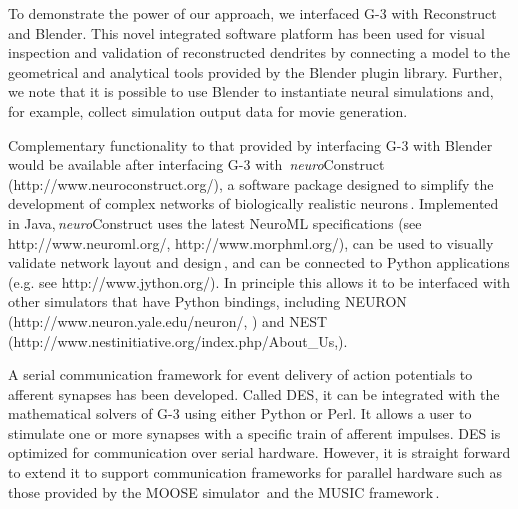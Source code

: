 \documentclass[10pt]{article}
\begin{document}
To demonstrate the power of our approach, we
interfaced G-3 with Reconstruct and Blender. This novel integrated software
platform has been used for visual inspection and validation of
reconstructed dendrites by connecting a model to the geometrical and
analytical tools provided by the Blender plugin library.  Further, we
note that it is possible to use Blender to instantiate neural
simulations and, for example, collect simulation output data for
movie generation.  

Complementary functionality to that provided by interfacing G-3 with
Blender would be available after interfacing G-3 with\,{\it
  neuro}Construct (http://www.neuroconstruct.org/), a software package
designed to simplify the development of complex networks of
biologically realistic neurons\,\cite{gleeson10:neuroml,
  gleeson07}.  Implemented in Java,\,{\it neuro}Construct uses the
latest NeuroML specifications (see http://www.neuroml.org/,
http://www.morphml.org/), can be used to visually validate network
layout and design\,\cite{crook07:_morph}, and can be connected to
Python applications (e.g.  see http://www.jython.org/).  In principle
this allows it to be interfaced with other simulators that have Python
bindings, including NEURON  (http://www.neuron.yale.edu/neuron/, \cite{m93:_neural_system}) and NEST (http://www.nest\-initiative.org/index.php/About\_Us,\cite{diesmann01}).

A serial communication framework for event delivery of action
potentials to afferent synapses has been developed.  Called
DES, it can be integrated
with the mathematical solvers of G-3 using either Python or Perl. It allows a user to stimulate one or more synapses with a specific train of afferent impulses.
DES is optimized for communication over serial hardware. However, it is straight forward
to extend it to support communication frameworks for parallel
hardware such as those provided by the MOOSE
simulator\,\cite{ray08:_pymoos} and the MUSIC
framework\,\cite{djurfeldt10:_run_time_inter_between_neuron}.
\end{document}
